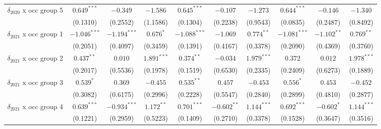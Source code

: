 \begin{tabular}{l|ccc|ccc|ccc}
$\delta_{2020}$ x occ group 5          &           $0.649^{***}$ &        $-0.349$ &        $-1.586$ &            $0.645^{***}$ &        $-0.107$ &        $-1.273$ &            $0.644^{***}$ &        $-0.146$ &        $-1.340$ \\
                                       &                (0.1310) &        (0.2552) &        (1.1586) &                 (0.1304) &        (0.2238) &        (0.9543) &                 (0.0835) &        (0.2487) &        (0.8492) \\
$\delta_{2021}$ x occ group 1          &          $-1.046^{***}$ &  $-1.194^{***}$ &       $0.676^*$ &           $-1.088^{***}$ &        $-1.069$ &    $0.774^{**}$ &           $-1.081^{***}$ &   $-1.102^{**}$ &    $0.769^{**}$ \\
                                       &                (0.2051) &        (0.4097) &        (0.3459) &                 (0.1391) &        (0.4167) &        (0.3378) &                 (0.2090) &        (0.4369) &        (0.3760) \\
$\delta_{2021}$ x occ group 2          &            $0.437^{**}$ &         $0.010$ &   $1.891^{***}$ &             $0.374^{**}$ &        $-0.034$ &   $1.979^{***}$ &                  $0.372$ &         $0.012$ &   $1.978^{***}$ \\
                                       &                (0.2017) &        (0.5536) &        (0.1978) &                 (0.1519) &        (0.6530) &        (0.2335) &                 (0.2409) &        (0.6273) &        (0.1889) \\
$\delta_{2021}$ x occ group 3          &               $0.539^*$ &         $0.369$ &        $-0.455$ &             $0.535^{**}$ &         $0.457$ &        $-0.453$ &                $0.556^*$ &         $0.453$ &        $-0.452$ \\
                                       &                (0.3082) &        (0.6175) &        (0.2996) &                 (0.2228) &        (0.5547) &        (0.2840) &                 (0.2899) &        (0.4810) &        (0.2877) \\
$\delta_{2021}$ x occ group 4          &           $0.639^{***}$ &  $-0.934^{***}$ &    $1.172^{**}$ &            $0.701^{***}$ &   $-0.602^{**}$ &   $1.144^{***}$ &            $0.692^{***}$ &      $-0.602^*$ &   $1.144^{***}$ \\
                                       &                (0.1221) &        (0.2959) &        (0.5223) &                 (0.1409) &        (0.2710) &        (0.3378) &                 (0.1528) &        (0.3647) &        (0.3516) \\

\end{tabular}
